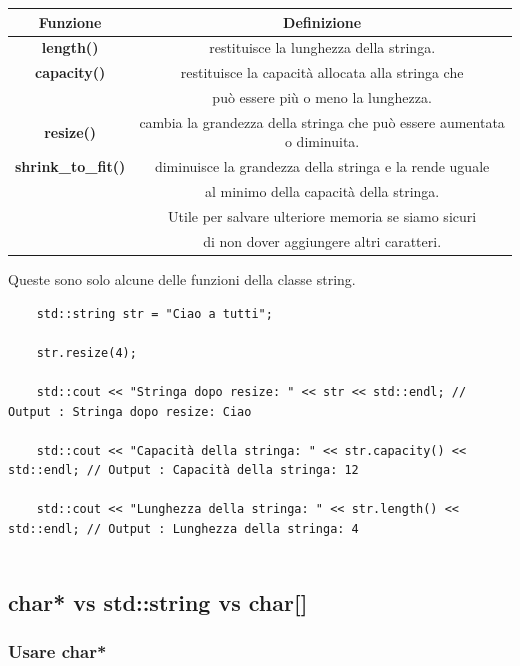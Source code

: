 \begin{tabular}{|c|c|}
	\hline
	\textbf{Funzione} & \textbf{Definizione} \\
	\hline
	\textbf{length()} & \textsf{\small restituisce la lunghezza della stringa.} \\
	\hline
	\textbf{capacity()} & \textsf{\small restituisce la capacità allocata alla stringa che } \\
	\textbf{} & \textsf{\small può essere più o meno la lunghezza.} \\
	\hline
	\textbf{resize()} & \textsf{\small cambia la grandezza della stringa che può essere aumentata o diminuita.} \\
	\hline
	\textbf{shrink\_to\_fit()} & \textsf{\small diminuisce la grandezza della stringa e la rende uguale } \\
	\textbf{} & \textsf{\small al minimo della capacità della stringa.} \\
	\textbf{} & \textsf{\small Utile per salvare ulteriore memoria se siamo sicuri } \\
	\textbf{} & \textsf{\small di non dover aggiungere altri caratteri.} \\
	\hline
\end{tabular} 

\textsf{\small Queste sono solo alcune delle funzioni della classe string.} \\

\begin{lstlisting}
	std::string str = "Ciao a tutti";
	
	str.resize(4); 
	
	std::cout << "Stringa dopo resize: " << str << std::endl; // Output : Stringa dopo resize: Ciao
	
	std::cout << "Capacità della stringa: " << str.capacity() << std::endl; // Output : Capacità della stringa: 12
	
	std::cout << "Lunghezza della stringa: " << str.length() << std::endl; // Output : Lunghezza della stringa: 4
	
\end{lstlisting}

\subsection{char* vs std::string vs char[]}

\subsubsection{Usare char*}

